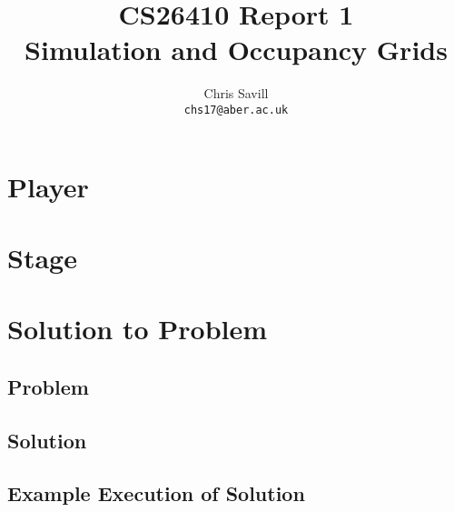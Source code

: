 \documentclass[a4paper,12pt]{article}
\title{CS26410 Report 1\\
Simulation and Occupancy Grids}
\author{Chris Savill\\\texttt{chs17@aber.ac.uk}}
\begin{document}
\maketitle
\newpage
\tableofcontents
\newpage

\section{Player}

\section{Stage}

\section{Solution to Problem}

\subsection{Problem}

\subsection{Solution}

\subsection{Example Execution of Solution}
\end{document}
